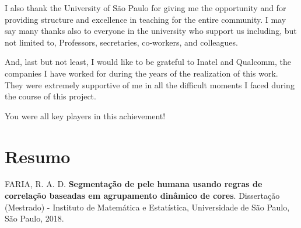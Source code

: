 \documentclass[12pt,twoside,a4paper]{book}
\theoremstyle{plain}
\theoremstyle{definition}
\begin{document}
I also thank the University of São Paulo for giving me the opportunity and for providing structure and excellence in teaching for the entire community. I may say many thanks also to everyone in the university who support us including, but not limited to, Professors, secretaries, co-workers, and colleagues.

And, last but not least, I would like to be grateful to Inatel and Qualcomm, the companies I have worked for during the years of the realization of this work. They were extremely supportive of me in all the difficult moments I faced during the course of this project.

You were all key players in this achievement!


\chapter*{Resumo}

\noindent FARIA, R. A. D. \textbf{Segmentação de pele humana usando regras de correlação baseadas em agrupamento dinâmico de cores}.
Dissertação (Mestrado) - Instituto de Matemática e Estatística,
Universidade de São Paulo, São Paulo, 2018.
\\
\end{document}
